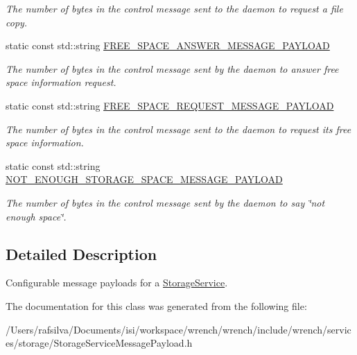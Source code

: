 \begin{DoxyCompactItemize}
\begin{DoxyCompactList}\small\item\em The number of bytes in the control message sent to the daemon to request a file copy. \end{DoxyCompactList}\item 
\mbox{\label{classwrench_1_1_storage_service_message_payload_a00fa84710c6e868ff41ab593562e16c6}} 
static const std\+::string \hyperlink{classwrench_1_1_storage_service_message_payload_a00fa84710c6e868ff41ab593562e16c6}{F\+R\+E\+E\+\_\+\+S\+P\+A\+C\+E\+\_\+\+A\+N\+S\+W\+E\+R\+\_\+\+M\+E\+S\+S\+A\+G\+E\+\_\+\+P\+A\+Y\+L\+O\+AD}
\begin{DoxyCompactList}\small\item\em The number of bytes in the control message sent by the daemon to answer free space information request. \end{DoxyCompactList}\item 
\mbox{\label{classwrench_1_1_storage_service_message_payload_a681e602d270caf31ca9173de0bd09ac8}} 
static const std\+::string \hyperlink{classwrench_1_1_storage_service_message_payload_a681e602d270caf31ca9173de0bd09ac8}{F\+R\+E\+E\+\_\+\+S\+P\+A\+C\+E\+\_\+\+R\+E\+Q\+U\+E\+S\+T\+\_\+\+M\+E\+S\+S\+A\+G\+E\+\_\+\+P\+A\+Y\+L\+O\+AD}
\begin{DoxyCompactList}\small\item\em The number of bytes in the control message sent to the daemon to request its free space information. \end{DoxyCompactList}\item 
\mbox{\label{classwrench_1_1_storage_service_message_payload_ae0d8ee8f07c557944f77e8363ec8334a}} 
static const std\+::string \hyperlink{classwrench_1_1_storage_service_message_payload_ae0d8ee8f07c557944f77e8363ec8334a}{N\+O\+T\+\_\+\+E\+N\+O\+U\+G\+H\+\_\+\+S\+T\+O\+R\+A\+G\+E\+\_\+\+S\+P\+A\+C\+E\+\_\+\+M\+E\+S\+S\+A\+G\+E\+\_\+\+P\+A\+Y\+L\+O\+AD}
\begin{DoxyCompactList}\small\item\em The number of bytes in the control message sent by the daemon to say \char`\"{}not enough space\char`\"{}. \end{DoxyCompactList}\end{DoxyCompactItemize}


\subsection{Detailed Description}
Configurable message payloads for a \hyperlink{classwrench_1_1_storage_service}{Storage\+Service}. 

The documentation for this class was generated from the following file\+:\begin{DoxyCompactItemize}
\item 
/\+Users/rafsilva/\+Documents/isi/workspace/wrench/wrench/include/wrench/services/storage/Storage\+Service\+Message\+Payload.\+h\end{DoxyCompactItemize}
